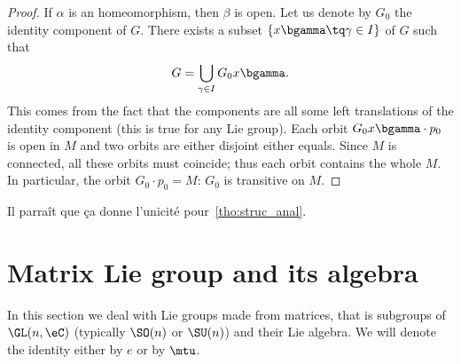\begin{proof}
If $\alpha$ is an homeomorphism, then $\beta$ is open. Let us denote by $G_0$ the identity component of $G$. There exists a subset $\{x\bgamma\tq\gamma\in I\}$ of $G$ such that
\[
    G=\bigcup_{\gamma\in I}G_0x\bgamma.
\]
This comes from the fact that the components are all some left translations of the identity component (this is true for any Lie group). Each orbit $G_0x\bgamma\cdot p_0$ is open in $M$ and two orbits are either disjoint either equals. Since $M$ is connected, all these orbits must coincide; thus each orbit contains the whole $M$. In particular, the orbit $G_0\cdot p_0=M$: $G_0$ is transitive on $M$.

\end{proof}

\begin{probleme}
Il parra\^it que \c ca donne l'unicit\'e pour~\ref{tho:struc_anal}.
\end{probleme}

\section{Matrix Lie group and its algebra}
\label{SECooTSAJooNtjgMD}

In this section we deal with Lie groups made from matrices, that is subgroups of \( \GL(n, \eC)\) (typically \( \SO(n)\) or \( \SU(n)\)) and their Lie algebra. We will denote the identity either by \( e\) or by \( \mtu\).

